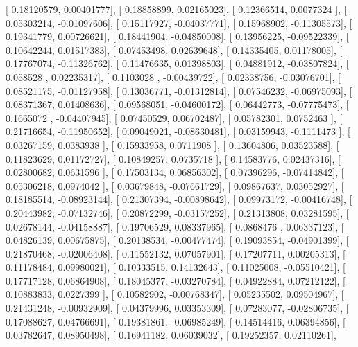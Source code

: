 \documentclass{article}
\begin{document}
       [ 0.18120579,  0.00401777],
       [ 0.18858899,  0.02165023],
       [ 0.12366514,  0.0077324 ],
       [ 0.05303214, -0.01097606],
       [ 0.15117927, -0.04037771],
       [ 0.15968902, -0.11305573],
       [ 0.19341779,  0.00726621],
       [ 0.18441904, -0.04850008],
       [ 0.13956225, -0.09522339],
       [ 0.10642244,  0.01517383],
       [ 0.07453498,  0.02639648],
       [ 0.14335405,  0.01178005],
       [ 0.17767074, -0.11326762],
       [ 0.11476635,  0.01398803],
       [ 0.04881912, -0.03807824],
       [ 0.058528  ,  0.02235317],
       [ 0.1103028 , -0.00439722],
       [ 0.02338756, -0.03076701],
       [ 0.08521175, -0.01127958],
       [ 0.13036771, -0.01312814],
       [ 0.07546232, -0.06975093],
       [ 0.08371367,  0.01408636],
       [ 0.09568051, -0.04600172],
       [ 0.06442773, -0.07775473],
       [ 0.1665072 , -0.04407945],
       [ 0.07450529,  0.06702487],
       [ 0.05782301,  0.0752463 ],
       [ 0.21716654, -0.11950652],
       [ 0.09049021, -0.08630481],
       [ 0.03159943, -0.1111473 ],
       [ 0.03267159,  0.0383938 ],
       [ 0.15933958,  0.0711908 ],
       [ 0.13604806,  0.03523588],
       [ 0.11823629,  0.01172727],
       [ 0.10849257,  0.0735718 ],
       [ 0.14583776,  0.02437316],
       [ 0.02800682,  0.0631596 ],
       [ 0.17503134,  0.06856302],
       [ 0.07396296, -0.07414842],
       [ 0.05306218,  0.0974042 ],
       [ 0.03679848, -0.07661729],
       [ 0.09867637,  0.03052927],
       [ 0.18185514, -0.08923144],
       [ 0.21307394, -0.00898642],
       [ 0.09973172, -0.00416748],
       [ 0.20443982, -0.07132746],
       [ 0.20872299, -0.03157252],
       [ 0.21313808,  0.03281595],
       [ 0.02678144, -0.04158887],
       [ 0.19706529,  0.08337965],
       [ 0.0868476 ,  0.06337123],
       [ 0.04826139,  0.00675875],
       [ 0.20138534, -0.00477474],
       [ 0.19093854, -0.04901399],
       [ 0.21870468, -0.02006408],
       [ 0.11552132,  0.07057901],
       [ 0.17207711,  0.00205313],
       [ 0.11178484,  0.09980021],
       [ 0.10333515,  0.14132643],
       [ 0.11025008, -0.05510421],
       [ 0.17717128,  0.06864908],
       [ 0.18045377, -0.03270784],
       [ 0.04922884,  0.07212122],
       [ 0.10883833,  0.0227399 ],
       [ 0.10582902, -0.00768347],
       [ 0.05235502,  0.09504967],
       [ 0.21431248, -0.00932909],
       [ 0.04379996,  0.03353309],
       [ 0.07283077, -0.02806735],
       [ 0.17088627,  0.04766691],
       [ 0.19381861, -0.06985249],
       [ 0.14514416,  0.06394856],
       [ 0.03782647,  0.08950498],
       [ 0.16941182,  0.06039032],
       [ 0.19252357,  0.02110261],
\end{document}

